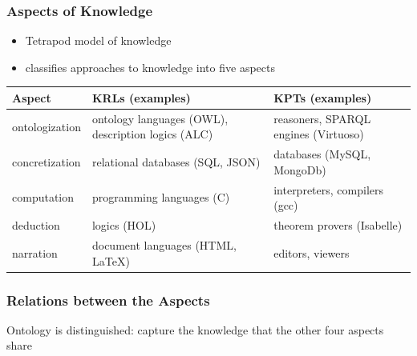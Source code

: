 \documentclass{beamer}
\begin{document}
\begin{frame}\frametitle{Aspects of Knowledge}
\begin{itemize}
\item Tetrapod model of knowledge
\item classifies approaches to knowledge into five aspects
\end{itemize}

\begin{center}
\begin{tabular}{lll}
Aspect & KRLs (examples) & KPTs (examples) \\
\hline
ontologization & ontology languages (OWL), description logics (ALC) & reasoners, SPARQL engines (Virtuoso) \\
concretization & relational databases (SQL, JSON) & databases (MySQL, MongoDb) \\
computation & programming languages (C) & interpreters, compilers (gcc) \\
deduction & logics (HOL) & theorem provers (Isabelle) \\
narration & document languages (HTML, LaTeX) & editors, viewers
\end{tabular}
\end{center}
\end{frame}

\begin{frame}\frametitle{Relations between the Aspects}
Ontology is distinguished: capture the knowledge that the other four aspects share

\begin{center}
\end{center}
\end{frame}
\end{document}
